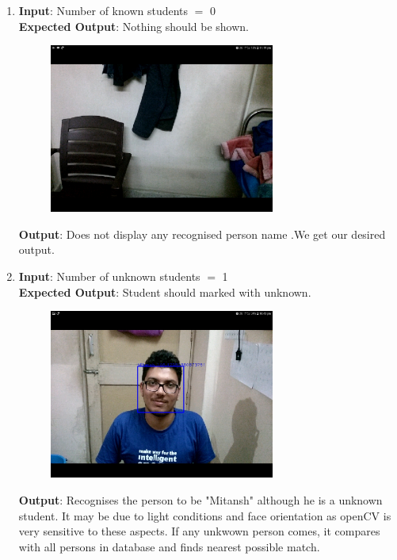 \documentclass{scrreprt}
\begin{document}
\begin{itemize}
\begin{enumerate}
\item \textbf{Input}: Number of known students $=$ 0\\
\textbf{Expected Output}: Nothing should be shown.
\begin{figure}[H]
\centering
\includegraphics[width=0.7\textwidth, keepaspectratio]{camnostud.jpg}
\end{figure}
\textbf{Output}: Does not display any recognised person name .We get our desired output.

\item \textbf{Input}: Number of unknown students $=$ 1\\
\textbf{Expected Output}: Student should marked with unknown.
\begin{figure}[H]
\centering
\includegraphics[width=0.7\textwidth, keepaspectratio]{camunknown.jpg}
\end{figure}
\textbf{Output}: Recognises the person to be "Mitansh" although he is a unknown student. It may be due to light conditions and face orientation as openCV is very sensitive to these aspects. If any unkwown person comes, it compares with all persons in database and finds nearest possible match.


\end{enumerate}
\end{itemize}
\end{document}

